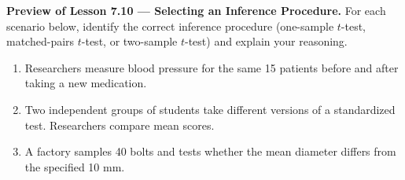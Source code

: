\documentclass[10pt]{article}
\begin{document}
\newpage
\begin{extensionbox}
\textbf{Preview of Lesson 7.10 --- Selecting an Inference Procedure.}
For each scenario below, identify the correct inference procedure (one-sample $t$-test,
matched-pairs $t$-test, or two-sample $t$-test) and explain your reasoning.
\begin{enumerate}[label=(\alph*)]
  \item Researchers measure blood pressure for the same 15 patients before and after
        taking a new medication.
  \item Two independent groups of students take different versions of a standardized test.
        Researchers compare mean scores.
  \item A factory samples 40 bolts and tests whether the mean diameter differs from the
        specified 10 mm.
\end{enumerate}
\ansline{}
\end{extensionbox}
\end{document}
